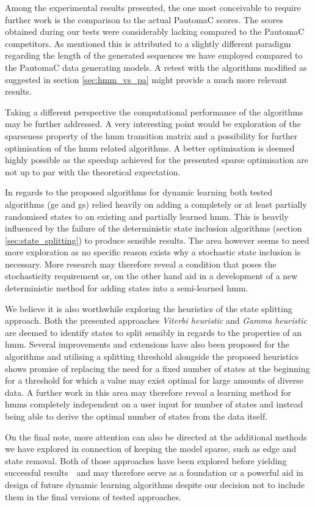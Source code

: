 Among the experimental results presented, the one most conceivable to require further work is the comparison to the actual PautomaC scores. The scores obtained during our tests were considerably lacking compared to the PautomaC competitors. As mentioned this is attributed to a slightly different paradigm regarding the length of the generated sequences we have employed compared to the PautomaC data generating models. A retest with the algorithms modified as suggested in section \ref{sec:hmm_vs_pa} might provide a much more relevant results.

Taking a different perspective the computational performance of the algorithms may be further addressed. A very interesting point would be exploration of the sparseness property of the \gls{hmm} transition matrix and a possibility for further optimisation of the \gls{hmm} related algorithms. A better optimisation is deemed highly possible as the speedup achieved for the presented sparse optimisation are not up to par with the theoretical expectation.

In regards to the proposed algorithms for dynamic learning both tested algorithms (\acrlong{ge} and \acrlong{gs}) relied heavily on adding a completely or at least partially randomised states to an existing and partially learned \gls{hmm}. This is heavily influenced by the failure of the deterministic state inclusion algorithms (section \ref{sec:state_splitting}) to produce sensible results. The area however seems to need more exploration as no specific reason exists why a stochastic state inclusion is necessary. More research may therefore reveal a condition that poses the stochasticity requirement or, on the other hand aid in a development of a new deterministic method for adding states into a semi-learned \gls{hmm}.

We believe it is also worthwhile exploring the heuristics of the state splitting approach. Both the presented approaches \emph{Viterbi heuristic} and \emph{Gamma heuristic} are deemed to identify states to split sensibly in regards to the properties of an \gls{hmm}. Several improvements and extensions have also been proposed for the algorithms and utilising a splitting threshold alongside the proposed heuristics shows promise of replacing the need for a fixed number of states at the beginning for a threshold for which a value may exist optimal for large amounts of diverse data. A further work in this area may therefore reveal a learning method for \glspl{hmm} completely independent on a user input for number of states and instead being able to derive the optimal number of states from the data itself.

On the final note, more attention can also be directed at the additional methods we have explored in connection of keeping the model sparse, such as edge and state removal. Both of those approaches have been explored before yielding successful results~\cite{bicego2003, bicego2007}~and may therefore serve as a foundation or a powerful aid in design of future dynamic learning algorithms despite our decision not to include them in the final versions of tested approaches.